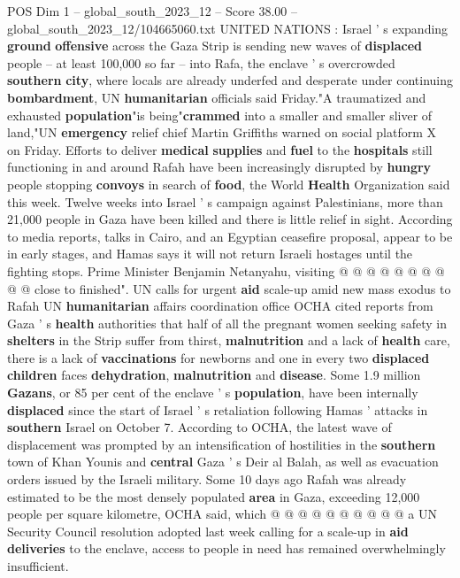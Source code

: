 \begin{textsample}{POS Dim 1 – global\_south\_2023\_12 – Score 38.00 – global\_south\_2023\_12/104665060.txt}  \label{ex:f1_pos_033}
UNITED NATIONS : Israel ' s expanding \textbf{ground} \textbf{offensive} across the Gaza Strip is sending new waves of \textbf{displaced} people -- at least 100,000 so far -- into Rafa, the enclave ' s overcrowded \textbf{southern} \textbf{city}, where locals are already underfed and desperate under continuing \textbf{bombardment}, UN \textbf{humanitarian} officials said Friday."A traumatized and exhausted \textbf{population}"is being"\textbf{crammed} into a smaller and smaller sliver of land,"UN \textbf{emergency} relief chief Martin Griffiths warned on social platform X on Friday.
Efforts to deliver \textbf{medical} \textbf{supplies} and \textbf{fuel} to the \textbf{hospitals} still functioning in and around Rafah have been increasingly disrupted by \textbf{hungry} people stopping \textbf{convoys} in search of \textbf{food}, the World \textbf{Health} Organization said this week.
Twelve weeks into Israel ' s campaign against Palestinians, more than 21,000 people in Gaza have been killed and there is little relief in sight.
According to media reports, talks in Cairo, and an Egyptian ceasefire proposal, appear to be in early stages, and Hamas says it will not return Israeli hostages until the fighting stops.
Prime Minister Benjamin Netanyahu, visiting @ @ @ @ @ @ @ @ @ @ close to finished".
UN calls for urgent \textbf{aid} scale-up amid new mass exodus to Rafah UN \textbf{humanitarian} affairs coordination office OCHA cited reports from Gaza ' s \textbf{health} authorities that half of all the pregnant women seeking safety in \textbf{shelters} in the Strip suffer from thirst, \textbf{malnutrition} and a lack of \textbf{health} care, there is a lack of \textbf{vaccinations} for newborns and one in every two \textbf{displaced} \textbf{children} faces \textbf{dehydration}, \textbf{malnutrition} and \textbf{disease}.
Some 1.9 million \textbf{Gazans}, or 85 per cent of the enclave ' s \textbf{population}, have been internally \textbf{displaced} since the start of Israel ' s retaliation following Hamas ' attacks in \textbf{southern} Israel on October 7.
According to OCHA, the latest wave of displacement was prompted by an intensification of hostilities in the \textbf{southern} town of Khan Younis and \textbf{central} Gaza ' s Deir al Balah, as well as evacuation orders issued by the Israeli military.
Some 10 days ago Rafah was already estimated to be the most densely populated \textbf{area} in Gaza, exceeding 12,000 people per square kilometre, OCHA said, which @ @ @ @ @ @ @ @ @ @ a UN Security Council resolution adopted last week calling for a scale-up in \textbf{aid} \textbf{deliveries} to the enclave, access to people in need has remained overwhelmingly insufficient.

\end{textsample}
